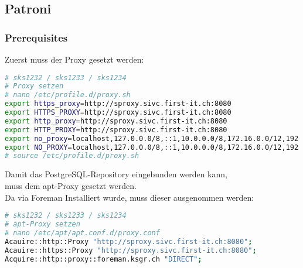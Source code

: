 
\begin{flushleft}
    \subsection{Patroni}
    \subsubsection{Prerequisites}
\end{flushleft}
\begin{flushleft}
    Zuerst muss der Proxy gesetzt werden:
    \lstset{style=gra_codestyle}
\begin{lstlisting}[language=bash, caption=Patroni - Proxy Settings,captionpos=b,label={lst:patroni-proxy-settings},breaklines=true]
# sks1232 / sks1233 / sks1234
# Proxy setzen
# nano /etc/profile.d/proxy.sh
export https_proxy=http://sproxy.sivc.first-it.ch:8080
export HTTPS_PROXY=http://sproxy.sivc.first-it.ch:8080
export http_proxy=http://sproxy.sivc.first-it.ch:8080
export HTTP_PROXY=http://sproxy.sivc.first-it.ch:8080
export no_proxy=localhost,127.0.0.0/8,::1,10.0.0.0/8,172.16.0.0/12,192.168.0.0/16
export NO_PROXY=localhost,127.0.0.0/8,::1,10.0.0.0/8,172.16.0.0/12,192.168.0.0/16
# source /etc/profile.d/proxy.sh
\end{lstlisting}
\end{flushleft}
\begin{flushleft}
    Damit das PostgreSQL-Repository eingebunden werden kann,\\
    muss dem apt-Proxy gesetzt werden.\\
    Da via \Gls{Foreman} Installiert wurde, muss dieser ausgenommen werden:
    \lstset{style=gra_codestyle}
\begin{lstlisting}[language=bash, caption=Patroni - apt-Proxy Settings,captionpos=b,label={lst:patroni-apt-proxy-settings},breaklines=true]
# sks1232 / sks1233 / sks1234
# apt-Proxy setzen
# nano /etc/apt/apt.conf.d/proxy.conf
Acauire::http::Proxy "http://sproxy.sivc.first-it.ch:8080";
Acauire::https::Proxy "http://sproxy.sivc.first-it.ch:8080";
Acquire::http::proxy::foreman.ksgr.ch "DIRECT";
\end{lstlisting}
\end{flushleft}
